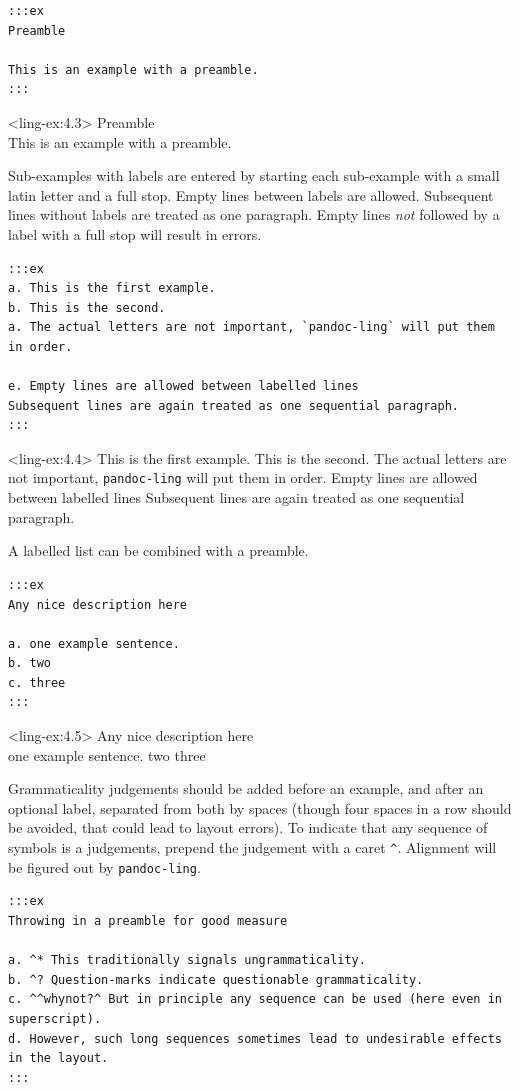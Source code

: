 \documentclass[
]{article}
\begin{document}
\begin{verbatim}
:::ex
Preamble

This is an example with a preamble.
:::
\end{verbatim}

\ex<ling-ex:4.3> Preamble\\
  This is an example with a preamble.
\xe

Sub-examples with labels are entered by starting each sub-example with a
small latin letter and a full stop. Empty lines between labels are
allowed. Subsequent lines without labels are treated as one paragraph.
Empty lines \emph{not} followed by a label with a full stop will result
in errors.

\begin{verbatim}
:::ex
a. This is the first example.
b. This is the second.
a. The actual letters are not important, `pandoc-ling` will put them in order.

e. Empty lines are allowed between labelled lines
Subsequent lines are again treated as one sequential paragraph.
:::
\end{verbatim}

\pex[*=]<ling-ex:4.4> 
  \a This is the first example.
  \a This is the second.
  \a The actual letters are not important, \texttt{pandoc-ling} will put
them in order.
  \a Empty lines are allowed between labelled lines Subsequent lines are
again treated as one sequential paragraph.
\xe

A labelled list can be combined with a preamble.

\begin{verbatim}
:::ex
Any nice description here

a. one example sentence.
b. two
c. three
:::
\end{verbatim}

\pex[*=]<ling-ex:4.5> Any nice description here\\
  \a one example sentence.
  \a two
  \a three
\xe

Grammaticality judgements should be added before an example, and after
an optional label, separated from both by spaces (though four spaces in
a row should be avoided, that could lead to layout errors). To indicate
that any sequence of symbols is a judgements, prepend the judgement with
a caret \texttt{\^{}}. Alignment will be figured out by
\texttt{pandoc-ling}.

\begin{verbatim}
:::ex
Throwing in a preamble for good measure

a. ^* This traditionally signals ungrammaticality.
b. ^? Question-marks indicate questionable grammaticality.
c. ^^whynot?^ But in principle any sequence can be used (here even in superscript).
d. However, such long sequences sometimes lead to undesirable effects in the layout.
:::
\end{verbatim}
\end{document}
